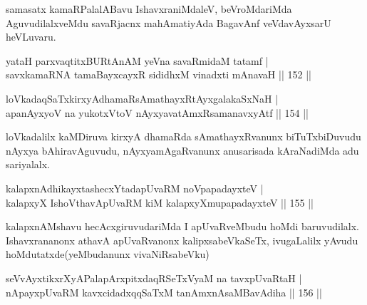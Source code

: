 \begin{artha}%
samasatx kamaRPalalABavu IshavxraniMdaleV, beVroMdariMda AguvudilalxveMdu savaRjacnx mahAmatiyAda BagavAnf veVdavAyxsarU heVLuvaru.
\end{artha}


\begin{shl}
yataH parxvaqtitxBURtAnAM yeVna savaRmidaM tatamf |\\
savxkamaRNA tamaBayxcayxR sididhxM vinadxti mAnavaH \hfill || 152 ||
\end{shl}


\begin{shl}
loVkadaqSaTxkirxyAdhamaRsAmathayxRtAyxgalakaSxNaH |\\
apanAyxyoV na yukotxV\s toV nAyxyavatAmxRsamanavxyAtf \hfill || 154 ||
\end{shl}

\begin{artha}
loVkadalilx kaMDiruva kirxyA dhamaRda sAmathayxRvanunx biTuTxbiDuvudu nAyxya bAhiravAguvudu, nAyxyamAgaRvanunx anusarisada kAraNadiMda adu sariyalalx.
\end{artha}

\begin{shl}
kalapxnAdhikayxtashecxYtadapUvaRM noVpapadayxteV  |\\
kalapxyX IshoV\s thavA\s pUvaRM kiM kalapxyXmupapadayxteV \hfill || 155 ||
\end{shl}

\begin{artha}
kalapxnAMshavu hecAcxgiruvudariMda I apUvaRveMbudu hoMdi baruvudilalx. Ishavxrananonx athavA apUvaRvanonx kalipxsabeVkaSeTx, ivugaLalilx yAvudu hoMdutatxde(yeMbudanunx vivaNiRsabeVku)
\end{artha}


\begin{shl}
seVvAyxtikxrXyAPalapArxpitxdaqRSeTxVyaM na tavxpUvaRtaH |\\
nApayxpUvaRM kavxcidadxqqSaTxM tanAmxnAsaMBavAdiha \hfill || 156 ||
\end{shl}

